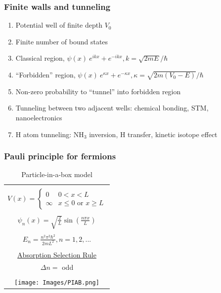 \documentclass[11pt]{article}
\begin{document}
\subsubsection{Finite walls and tunneling}
\label{sec:orge89e6cd}
\begin{enumerate}
\item Potential well of finite depth \(V_0\)
\item Finite number of bound states
\item Classical region, \(\psi(x) ~ e^{ikx}+e^{-ikx}, k=\sqrt{2mE}/\hbar\)
\item ``Forbidden'' region, \(\psi(x) ~ e^{\kappa x}+e^{-\kappa x},
      \kappa=\sqrt{2m(V_0-E)}/\hbar\)
\item Non-zero probability to ``tunnel'' into forbidden region
\item Tunneling between two adjacent wells: chemical bonding, STM, nanoelectronics
\item H atom tunneling: NH\(_3\) inversion, H transfer, kinetic isotope effect
\end{enumerate}
\subsubsection{Pauli principle for fermions}
\label{sec:orgb9e9fa5}

\begin{table}[tb]
   \begin{center}
   \caption{Particle-in-a-box model}
    \label{Particle-in-a-box}
\begin{tabular}[h]{|c|}
\hline
 \\
$\displaystyle       V(x) = \left \{
        \begin{array}{rl}
          0 & 0 < x < L \\
          \infty & x \leq 0 \text{ or } x \geq L
        \end{array} \right . $ \\
 \\
$\displaystyle     \psi_n(x) =\sqrt{\frac{2}{L}} \sin \left ( \frac{n\pi x}{L} \right )$
\\ 
 \\
$\displaystyle     E_n =\frac{n^2\pi^2\hbar^2}{2mL^2}, n = 1, 2, ...$ \\
\\ \underline{Absorption Selection Rule} \\
$\displaystyle \Delta n = $ odd 
\\
\\
     \texttt{[image: Images/PIAB.png]} \\       
\hline
\end{tabular}
 \end{center}
\end{table}
\end{document}

